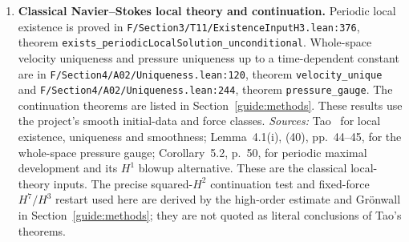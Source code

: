 \documentclass[11pt,a4paper]{article}
\newcommand{\code}[1]{\nolinkurl{#1}}
\newcommand{\source}[4]{\code{#1.lean:#2}, #4 \code{#3}}
\begin{document}
\begin{enumerate}[leftmargin=*,itemsep=5pt]
\item \textbf{Classical Navier--Stokes local theory and continuation.}
Periodic local existence is proved in
\source{F/Section3/T11/ExistenceInputH3}{376}{exists_periodicLocalSolution_unconditional}{theorem}.
Whole-space velocity uniqueness and pressure uniqueness up to a time-dependent
constant are in
\source{F/Section4/A02/Uniqueness}{120}{velocity_unique}{theorem}
and \source{F/Section4/A02/Uniqueness}{244}{pressure_gauge}{theorem}.
The continuation theorems are listed in Section~\ref{guide:methods}. These results use the
project's smooth initial-data and force classes.
\emph{Sources:} Tao~\cite[Theorems~5.1(ii)--(iv), p.~48, and
5.4(ii)--(iv), pp.~52--53]{tao} for local existence, uniqueness and smoothness;
Lemma~4.1(i), (40), pp.~44--45, for the whole-space pressure gauge;
Corollary~5.2, p.~50, for periodic maximal development and its $H^1$ blowup
alternative. These are the classical local-theory inputs. The precise
squared-$H^2$ continuation test and fixed-force $H^7/H^3$ restart used here
are derived by the high-order estimate and Gr\"onwall in Section~\ref{guide:methods}; they are
not quoted as literal conclusions of Tao's theorems.
\end{enumerate}
\end{document}
